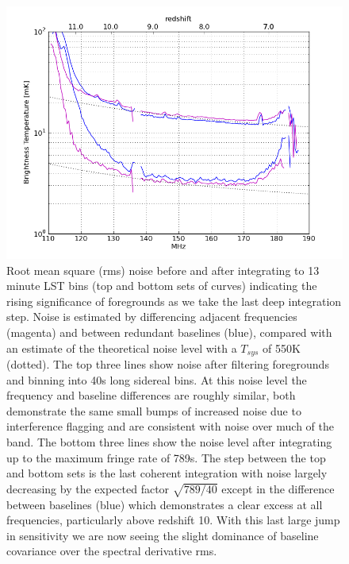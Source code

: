 \documentclass[preprint2]{aastex}
\begin{document}
\begin{figure}
\centering
\includegraphics[width=\columnwidth]{figures/psa32_trms_with_and_without_fr_filtering_z.png}
\caption{\label{fig:noise} Root mean square (rms) noise before and after integrating to 13 minute LST bins (top and bottom sets of curves) indicating the rising significance of foregrounds as we take the last deep integration step. Noise is estimated by differencing adjacent frequencies (magenta) and between redundant baselines (blue), compared with an estimate of the theoretical noise level with a $T_{sys}$ of 550K (dotted). The top three lines show noise after filtering foregrounds and binning into 40s long sidereal bins.  At this noise level the frequency and baseline differences are roughly similar, both demonstrate the same small bumps of increased noise due to interference flagging and are consistent with noise over much of the band.  The bottom three lines show the noise level after integrating up to the maximum fringe rate of 789s. The step between the top and bottom sets is the last coherent integration with noise largely decreasing by the expected factor $\sqrt{789/40}$ except in the difference between baselines (blue) which demonstrates a clear excess at all frequencies, particularly above redshift 10. With this last large jump in sensitivity we are now seeing the slight dominance of baseline covariance over the spectral derivative rms. }
\end{figure}
\end{document}
